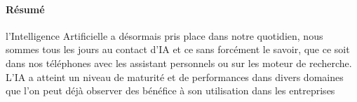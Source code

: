 \paragraph{Résumé}
l'Intelligence Artificielle a désormais pris place dans notre quotidien, 
nous sommes tous les jours au contact
d'IA et ce sans forcément le savoir, que ce soit dans nos téléphones 
avec les assistant personnels ou sur les moteur de recherche. \newline
L'IA a atteint un niveau de maturité et de performances dans divers domaines que l'on peut 
déjà observer des bénéfice à son utilisation dans les entreprises